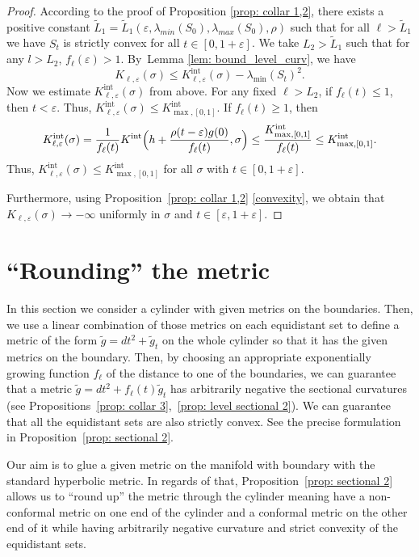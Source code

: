 \documentclass[JEP,XML,SOM,Unicode,NoFloatCountersInSection]{cedram}
\newcommand{\Int}{\mathrm{int}}
\theoremstyle{definition}
\let\eps\varepsilon
\renewcommand{\>}{{\rangle}}
\newcommand{\<}{{\langle}}
\begin{document}
\begin{proof}
According to the proof of Proposition \ref{prop: collar 1,2}, there exists a positive constant $\tilde L_1=\tilde L_1(\eps, \lambda_{min}(S_0), \lambda_{max}(S_0), \rho)$ such that for all $\ell>\tilde L_1$ we have $S_t$ is strictly convex for all $t\in[0,1+\eps]$. We take $L_2>\tilde L_1$ such that for any $l>L_2$, $f_{\ell}(\eps)>1$. By~Lemma \ref{lem: bound_level_curv}, we have
\[
K_{\ell,\eps}(\sigma)\leq K^{\Int}_{\ell,\eps}(\sigma)-\lambda_{\min}(S_t)^2.
\]
Now we estimate $K^{\Int}_{\ell,\eps}(\sigma)$ from above. For any fixed $\ell>L_2$, if $f_\ell(t)\leq 1$, then $t<\eps$. Thus, $K^{\Int}_{\ell,\eps}(\sigma)\leq K^{\Int}_{\max,[0,1]}$. If $f_\ell(t)\geq 1$, then
\[
K^{\Int}_{\ell,\eps}(\sigma)=\frac{1}{f_\ell(t)} K^{\Int}\Bigl(h+\frac{\rho(t-\eps)g(0)}{f_\ell(t)}, \sigma\Bigr)\leq \frac{K^{\Int}_{\max,[0,1]}}{f_\ell(t)}\leq K^{\Int}_{\max,[0,1]}.
\]
Thus, $K^{\Int}_{\ell,\eps}(\sigma)\leq K^{\Int}_{\max,[0,1]}$ for all $\sigma$ with $t\in[0,1+\eps]$.

Furthermore, using Proposition~\ref{prop: collar 1,2} \eqref{convexity}, we obtain that $K_{\ell,\eps}(\sigma)\to -\infty$ uniformly in $\sigma$ and $t\in[\eps,1+\eps]$.
\end{proof}

\section{``Rounding'' the metric}\label{construction 2}

In this section we consider a cylinder with given metrics on the boundaries. Then, we use a linear combination of those metrics on each equidistant set to define a metric of the form $\tilde g=dt^2+\tilde g_t$ on the whole cylinder so that it has the given metrics on the boundary. Then, by choosing an appropriate exponentially growing function $f_\ell$ of the distance to one of the boundaries, we can guarantee that a metric $\tilde g=dt^2+f_\ell(t)\tilde g_t$ has arbitrarily negative the sectional curvatures (see Propositions~\ref{prop: collar 3},~\ref{prop: level sectional 2}). We can guarantee that all the equidistant sets are also strictly convex. See the precise formulation in Proposition~\ref{prop: sectional 2}.

Our aim is to glue a given metric on the manifold with boundary with the standard hyperbolic metric. In regards of that, Proposition~\ref{prop: sectional 2} allows us to ``round up'' the metric through the cylinder meaning have a non-conformal metric on one end of the cylinder and a conformal metric on the other end of it while having arbitrarily negative curvature and strict convexity of the equidistant sets.
\end{document}
